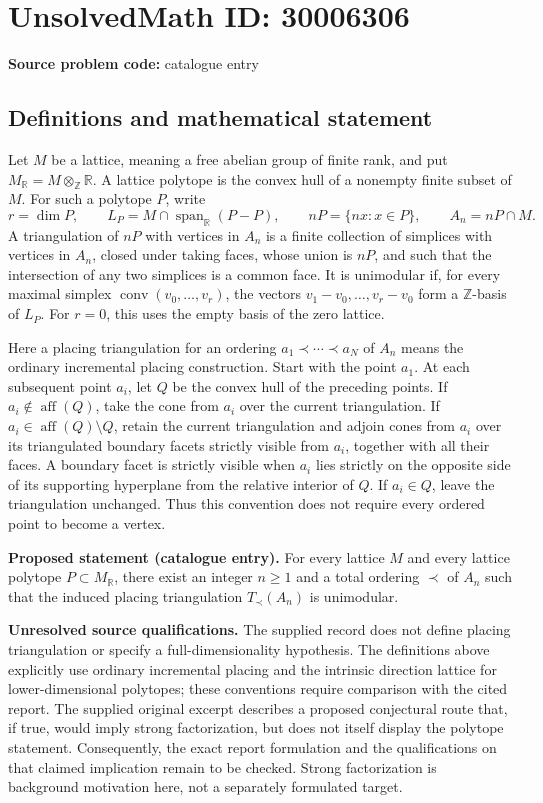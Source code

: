 \documentclass[11pt]{article}
\newcommand{\Z}{\mathbb{Z}}
\newcommand{\R}{\mathbb{R}}
\begin{document}
\section*{UnsolvedMath ID: 30006306}
\textbf{Source problem code:} catalogue entry
\subsection{Definitions and mathematical statement}
Let \(M\) be a lattice, meaning a free abelian group of finite rank, and put \(M_{\R}=M\otimes_{\Z}\R\). A lattice polytope is the convex hull of a nonempty finite subset of \(M\). For such a polytope \(P\), write
\[
r=\dim P,\qquad L_P=M\cap\operatorname{span}_{\R}(P-P),\qquad nP=\{nx:x\in P\},\qquad A_n=nP\cap M.
\]
A triangulation of \(nP\) with vertices in \(A_n\) is a finite collection of simplices with vertices in \(A_n\), closed under taking faces, whose union is \(nP\), and such that the intersection of any two simplices is a common face. It is unimodular if, for every maximal simplex \(\operatorname{conv}(v_0,\ldots,v_r)\), the vectors \(v_1-v_0,\ldots,v_r-v_0\) form a \(\Z\)-basis of \(L_P\). For \(r=0\), this uses the empty basis of the zero lattice.

Here a placing triangulation for an ordering \(a_1\prec\cdots\prec a_N\) of \(A_n\) means the ordinary incremental placing construction. Start with the point \(a_1\). At each subsequent point \(a_i\), let \(Q\) be the convex hull of the preceding points. If \(a_i\notin\operatorname{aff}(Q)\), take the cone from \(a_i\) over the current triangulation. If \(a_i\in\operatorname{aff}(Q)\setminus Q\), retain the current triangulation and adjoin cones from \(a_i\) over its triangulated boundary facets strictly visible from \(a_i\), together with all their faces. A boundary facet is strictly visible when \(a_i\) lies strictly on the opposite side of its supporting hyperplane from the relative interior of \(Q\). If \(a_i\in Q\), leave the triangulation unchanged. Thus this convention does not require every ordered point to become a vertex.

\textbf{Proposed statement (catalogue entry).} For every lattice \(M\) and every lattice polytope \(P\subset M_{\R}\), there exist an integer \(n\geq 1\) and a total ordering \(\prec\) of \(A_n\) such that the induced placing triangulation \(T_{\prec}(A_n)\) is unimodular.

\textbf{Unresolved source qualifications.} The supplied record does not define placing triangulation or specify a full-dimensionality hypothesis. The definitions above explicitly use ordinary incremental placing and the intrinsic direction lattice for lower-dimensional polytopes; these conventions require comparison with the cited report. The supplied original excerpt describes a proposed conjectural route that, if true, would imply strong factorization, but does not itself display the polytope statement. Consequently, the exact report formulation and the qualifications on that claimed implication remain to be checked. Strong factorization is background motivation here, not a separately formulated target.
\end{document}
